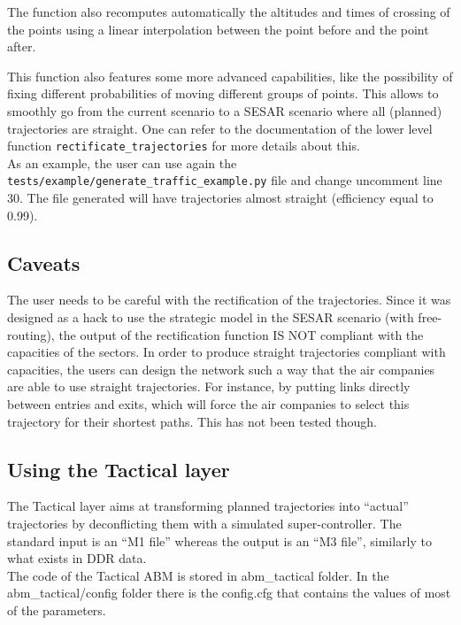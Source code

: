 \documentclass[12pt]{article}
\begin{document}
The function also recomputes automatically the altitudes and times of crossing of the points using a linear interpolation between the point before and the point after.

This function also features some more advanced capabilities, like the possibility of fixing different probabilities of moving different groups of points. This allows to smoothly go from the current scenario to a SESAR scenario where all (planned) trajectories are straight. One can refer to the documentation of the lower level function  \verb|rectificate_trajectories| for more details about this.
\\

As an example, the user can use again the \verb|tests/example/generate_traffic_example.py| file and change uncomment line 30. The file generated will have trajectories almost straight (efficiency equal to 0.99).

\subsection{Caveats}

The user needs to be careful with the rectification of the trajectories. Since it was designed as a hack to use the strategic model in the SESAR scenario (with free-routing), the output of the rectification function IS NOT compliant with the capacities of the sectors. In order to produce straight trajectories compliant with capacities, the users can design the network such a way that the air companies are able to use straight trajectories. For instance, by putting links directly between entries and exits, which will force the air companies to select this trajectory for their shortest paths. This has not been tested though.

\subsection{Using the Tactical layer}
\label{sec:tactical}
The Tactical layer aims at transforming planned trajectories into ``actual'' trajectories by deconflicting them with a simulated super-controller. The standard input is an ``M1 file'' whereas the output is an ``M3 file'', similarly to what exists in DDR data.
\\

The code of the Tactical ABM is stored in abm\_tactical folder. In the abm\_tactical/config folder there is the config.cfg that contains the values of most of the parameters.
\end{document}
